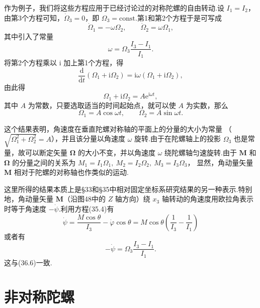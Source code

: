 作为例子，我们将这些方程应用于已经讨论过的对称陀螺的自由转动.设 $I_1=I_2$，由第3个方程可知，$\dot{\Omega}_3=0$，即 $\Omega_3=\mathrm{const}$.第1和第2个方程于是可写成
\begin{equation*}
  \dot{\Omega}_1=-\omega\Omega_2,\qquad
  \dot{\Omega}_2=\omega\Omega_1,
\end{equation*}
其中引入了常量
\begin{equation}
  \omega=\Omega_3\frac{I_3-I_1}{I_1}.
\end{equation}
将第2个方程乘以 $\mathrm{i}$ 加上第1个方程，得
\begin{equation*}
  \frac{\mathrm{d}}{\mathrm{d}t}\left(\Omega_1+\mathrm{i}\Omega_2\right)
  =\mathrm{i}\omega\left(\Omega_1+\mathrm{i}\Omega_2\right),
\end{equation*}
由此得
\begin{equation*}
  \Omega_1+\mathrm{i}\Omega_2=A\mathrm{e}^{\mathrm{i}\omega t},
\end{equation*}
其中 $A$ 为常数，只要选取适当的时间起始点，就可以使 $A$ 为实数，那么
\begin{equation}
  \Omega_1=A\cos\omega t,\qquad
  \Omega_2=A\sin\omega t.
\end{equation}

这个结果表明，角速度在垂直陀螺对称轴的平面上的分量的大小为常量
（$\sqrt{\Omega_1^2+\Omega_2^2}=A$），并且该分量以角速度 $\omega$ 旋转.由于在陀螺轴上的投影 $\Omega_3$ 也是常量，故可以断定矢量 $\boldsymbol{\Omega}$ 的大小不变，并以角速度 $\omega$ 绕陀螺轴匀速旋转.由于 $\boldsymbol{M}$ 和 $\boldsymbol{\Omega}$ 的分量之间的关系为
$M_1=I_1\Omega_1,\ M_2=I_2\Omega_2,\ M_3=I_3\Omega_3$，
显然，角动量矢量 $\boldsymbol{M}$ 相对于陀螺的对称轴也作类似的运动.

这里所得的结果本质上是§33和§35中相对固定坐标系研究结果的另一种表示.特别地，角动量矢量 $\boldsymbol{M}$（沿图48中的 $Z$ 轴方向）绕 $x_3$ 轴转动的角速度用欧拉角表示时等于角速度 $-\dot{\psi}$.利用方程(35.4)有
\begin{equation*}
  \dot{\psi}=\frac{M\cos\theta}{I_3}-\dot{\varphi}\cos\theta
  =M\cos\theta\left(\frac{1}{I_3}-\frac{1}{I_1}\right)
\end{equation*}
或者有
\begin{equation*}
  -\dot{\psi}=\Omega_3\frac{I_3-I_1}{I_1}.
\end{equation*}
这与(36.6)一致.

\section{非对称陀螺}

